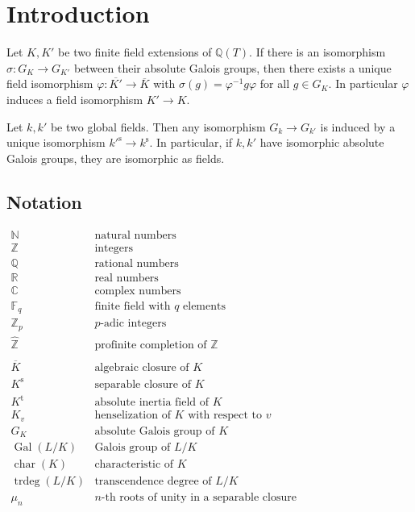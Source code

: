 \chapter{Introduction}

\begin{theorem}\label{thm:main-result}
Let $K,K'$ be two finite field extensions of $\mathbb{Q}(T)$. If there is an isomorphism $\sigma:G_K\to G_{K'}$ between their absolute Galois groups, then there exists a unique field isomorphism $\varphi:\overline{K'}\to\overline{K}$ with $\sigma(g)=\varphi^{-1}g\varphi$ for all $g\in G_K$. In particular $\varphi$ induces a field isomorphism $K'\to K$.
\end{theorem}

\begin{theorem}\label{thm:neukirch-uchida}
Let $k,k'$ be two global fields. Then any isomorphism $G_k\to G_{k'}$ is induced by a unique isomorphism $k'^{\text{s}}\to k^\text{s}$.  In particular, if $k,k'$ have isomorphic absolute Galois groups, they are isomorphic as fields.
\end{theorem}

\clearpage

\section{Notation}

$\begin{array}{ll}
\mathbb{N} & \text{natural numbers} \\
\mathbb{Z} & \text{integers}\\
\mathbb{Q} & \text{rational numbers}\\
\mathbb{R} & \text{real numbers}\\
\mathbb{C} & \text{complex numbers}\\
\mathbb{F}_q & \text{finite field with $q$ elements}\\
\mathbb{Z}_p & \text{$p$-adic integers}\\
\hat{\mathbb{Z}} & \text{profinite completion of $\mathbb{Z}$}\\
\\
\overline{K} & \text{algebraic closure of $K$}\\
K^\text{s} & \text{separable closure of $K$}\\
K^\text{t} & \text{absolute inertia field of $K$}\\
K_v & \text{henselization of $K$ with respect to $v$}\\
G_K & \text{absolute Galois group of $K$}\\
\operatorname{Gal}(L/K) & \text{Galois group of $L/K$}\\
\operatorname{char}(K) & \text{characteristic of $K$}\\
\operatorname{trdeg}(L/K) & \text{transcendence degree of $L/K$}\\
\mu_n & \text{$n$-th roots of unity in a separable closure}
\end{array}$